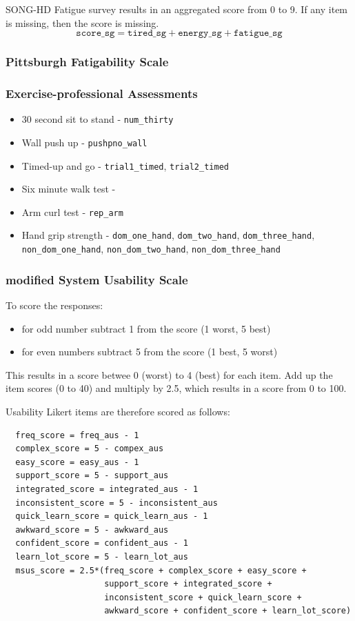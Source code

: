 \documentclass[11pt,parskip=half-]{scrartcl}
\providecommand{\tightlist}{%
  \setlength{\itemsep}{0pt}\setlength{\parskip}{0pt}}
\begin{document}
SONG-HD Fatigue survey results in an aggregated score from 0 to 9.
If any item is missing, then the score is missing.
$$
  \texttt{score\_sg} = \texttt{tired\_sg} + \texttt{energy\_sg} + \texttt{fatigue\_sg}
$$

\subsubsection*{Pittsburgh Fatigability Scale}

\subsubsection*{Exercise-professional Assessments}

\begin{itemize}\tightlist
  \item 30 second sit to stand - \texttt{num\_thirty}
  \item Wall push up - \texttt{pushpno\_wall}
  \item Timed-up and go - \texttt{trial1\_timed}, \texttt{trial2\_timed}
  \item Six minute walk test -
  \item Arm curl test - \texttt{rep\_arm}
  \item Hand grip strength - \texttt{dom\_one\_hand}, \texttt{dom\_two\_hand}, 
        \texttt{dom\_three\_hand},
        \texttt{non\_dom\_one\_hand}, \texttt{non\_dom\_two\_hand}, \texttt{non\_dom\_three\_hand}
\end{itemize}

\subsubsection*{modified System Usability Scale}

To score the responses:
\begin{itemize}\tightlist
  \item for odd number subtract 1 from the score (1 worst, 5 best)
  \item for even numbers subtract 5 from the score (1 best, 5 worst)
\end{itemize}
This results in a score betwee 0 (worst) to 4 (best) for each item.
Add up the item scores (0 to 40) and multiply by 2.5, which results in a score from 0 to 100.

Usability Likert items are therefore scored as follows:
\begin{verbatim}
  freq_score = freq_aus - 1
  complex_score = 5 - compex_aus
  easy_score = easy_aus - 1
  support_score = 5 - support_aus
  integrated_score = integrated_aus - 1
  inconsistent_score = 5 - inconsistent_aus
  quick_learn_score = quick_learn_aus - 1
  awkward_score = 5 - awkward_aus
  confident_score = confident_aus - 1
  learn_lot_score = 5 - learn_lot_aus
  msus_score = 2.5*(freq_score + complex_score + easy_score + 
                    support_score + integrated_score + 
                    inconsistent_score + quick_learn_score + 
                    awkward_score + confident_score + learn_lot_score)
\end{verbatim}
\end{document}
